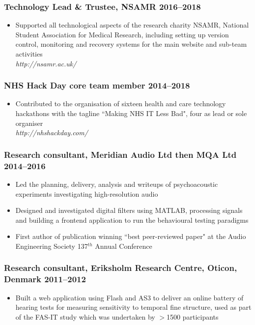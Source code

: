 \documentclass[a4paper, oneside, final, 11pt]{scrartcl} %
\begin{document}
\smallskip 
				
\subsubsection*{Technology Lead \& Trustee, NSAMR \hfill 2016--2018}  
\normalfont
\begin{itemize}
	\item Supported all technological aspects of the research charity NSAMR, National Student Association for Medical Research, including setting up version control, monitoring and recovery systems for the main website and sub-team activities\\
	\textit{http://nsamr.ac.uk/}
\end{itemize}

\smallskip 

\subsubsection*{NHS Hack Day core team member \hfill 2014--2018}  
\normalfont
\begin{itemize}
	\item Contributed to the organisation of sixteen health and care technology hackathons with the tagline ``Making NHS IT Less Bad", four as lead or sole organiser\\
	\textit{http://nhshackday.com/}
\end{itemize}

\smallskip 
				
\subsubsection*{Research consultant, Meridian Audio Ltd then MQA Ltd \hfill 2014--2016}  
\normalfont
\begin{itemize}
	\item Led the planning, delivery, analysis and writeups of psychoacoustic experiments investigating high-resolution audio
	\item Designed and investigated digital filters using MATLAB, processing signals and building a frontend application to run the behavioural testing paradigms
	\item First author of publication winning ``best peer-reviewed paper" at the Audio Engineering Society 137$^{th}$ Annual Conference
\end{itemize}

\smallskip 
				
\subsubsection*{Research consultant, Eriksholm Research Centre, Oticon, Denmark \hfill 2011--2012}  
\normalfont
\begin{itemize}
	\item Built a web application using Flash and AS3 to deliver an online battery of hearing tests for measuring sensitivity to temporal fine structure, used as part of the FAS-IT study which was undertaken by $>$1500 participants
\end{itemize}
\end{document}
